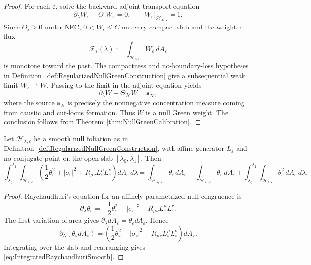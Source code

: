 \begin{proof}
For each $\varepsilon$, solve the backward adjoint transport equation
\[
    \partial_\lambda W_\varepsilon+\Theta_\varepsilon W_\varepsilon=0,
    \qquad
    W_\varepsilon|_{\mathcal H_{M,\varepsilon}}=1.
\]
Since $\Theta_\varepsilon\ge0$ under NEC, $0<W_\varepsilon\le C$ on every compact slab and the weighted flux
\[
    \mathcal F_\varepsilon(\lambda)
    :=
    \int_{\mathcal H_{\lambda,\varepsilon}}W_\varepsilon\,dA_\varepsilon
\]
is monotone toward the past. The compactness and no-boundary-loss hypotheses in Definition~\ref{def:RegularizedNullGreenConstruction} give a subsequential weak limit $W_\varepsilon\rightharpoonup W$. Passing to the limit in the adjoint equation yields
\[
    \partial_\lambda W+\Theta_{\mathcal N}W=\mathfrak s_{\mathcal N},
\]
where the source $\mathfrak s_{\mathcal N}$ is precisely the nonnegative concentration measure coming from caustic and cut-locus formation. Thus $W$ is a null Green weight. The conclusion follows from Theorem~\ref{thm:NullGreenCalibration}.
\end{proof}

\begin{lemma}\label{lem:IntegratedRaychaudhuriSmooth}
Let $\mathcal H_{\lambda,\varepsilon}$ be a smooth null foliation as in Definition~\ref{def:RegularizedNullGreenConstruction}, with affine generator $L_\varepsilon$ and no conjugate point on the open slab $[\lambda_0,\lambda_1]$. Then
\begin{equation}\label{eq:IntegratedRaychaudhuriSmooth}
    \int_{\lambda_0}^{\lambda_1}
    \int_{\mathcal H_{\lambda,\varepsilon}}
    \left(
        \frac12\theta_\varepsilon^2
        +|\sigma_\varepsilon|^2
        +R_{\mu\nu}L_\varepsilon^\mu L_\varepsilon^\nu
    \right)
    dA_\varepsilon\,d\lambda
    =
    \int_{\mathcal H_{\lambda_0,\varepsilon}}\theta_\varepsilon\,dA_\varepsilon
    -
    \int_{\mathcal H_{\lambda_1,\varepsilon}}\theta_\varepsilon\,dA_\varepsilon
    +
    \int_{\lambda_0}^{\lambda_1}
    \int_{\mathcal H_{\lambda,\varepsilon}}
    \theta_\varepsilon^2\,dA_\varepsilon\,d\lambda .
\end{equation}
\end{lemma}

\begin{proof}
Raychaudhuri's equation for an affinely parametrized null congruence is
\[
    \partial_\lambda\theta_\varepsilon
    =
    -\frac12\theta_\varepsilon^2
    -|\sigma_\varepsilon|^2
    -R_{\mu\nu}L_\varepsilon^\mu L_\varepsilon^\nu .
\]
The first variation of area gives $\partial_\lambda dA_\varepsilon=\theta_\varepsilon dA_\varepsilon$. Hence
\[
    \partial_\lambda(\theta_\varepsilon dA_\varepsilon)
    =
    \left(
        \frac12\theta_\varepsilon^2
        -|\sigma_\varepsilon|^2
        -R_{\mu\nu}L_\varepsilon^\mu L_\varepsilon^\nu
    \right)dA_\varepsilon .
\]
Integrating over the slab and rearranging gives \eqref{eq:IntegratedRaychaudhuriSmooth}.
\end{proof}

